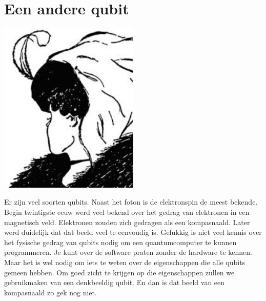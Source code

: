 \documentclass[../main.tex]{subfiles}
\begin{document}
\onlyinsubfile{
\setcounter{chapter}{0}
}
\notinsubfile{}
\section{Een andere qubit}\label{sec:anderqubit}

\begin{center}
\leavevmode\includegraphics[width=0.5\textwidth]{./img/ovjv.png}
\end{center}

Er zijn veel soorten qubits. Naast het foton is de elektronspin de meest bekende.  Begin twintigste eeuw werd veel bekend over het gedrag van elektronen in een magnetisch veld. Elektronen zouden zich gedragen als een kompasnaald.  Later werd duidelijk dat dat beeld veel te eenvoudig is.  Gelukkig is niet veel kennis over het fysische gedrag van qubits nodig om een quantumcomputer te kunnen programmeren.  Je kunt over de software praten zonder de hardware te kennen. Maar het is wel nodig om iets te weten over de  eigenschappen die alle  qubits gemeen hebben. Om goed zicht te krijgen op die eigenschappen zullen we gebruikmaken van een denkbeeldig qubit.  En dan is dat beeld van een kompasnaald zo gek nog niet.
\end{document}
